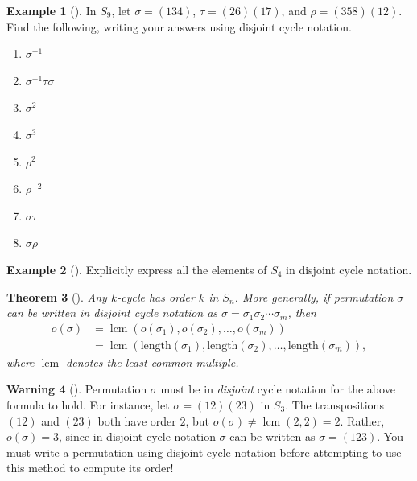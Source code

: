 \documentclass[10pt,openany,oneside]{book}
\theoremstyle{plain}
\newtheorem{theorem}{Theorem}[section]
\theoremstyle{definition}
\theoremstyle{definition}
\newtheorem{warning}[theorem]{Warning}
\theoremstyle{definition}
\newtheorem{example}[theorem]{Example}
\theoremstyle{definition}
\numberwithin{equation}{section}
\DeclareMathOperator{\lcm}{lcm}
\newcommand{\amp}{&}
\begin{document}
\begin{example}[]\label{s9ex}
In \(S_9\), let \(\sigma=(134)\), \(\tau=(26)(17)\), and \(\rho=(358)(12)\). Find the following, writing your answers using disjoint cycle notation. \leavevmode%
\begin{multicols}{4}
\begin{enumerate}[label=\alph*]
\item\hypertarget{li-331}{}\(\sigma^{-1}\)%
\item\hypertarget{li-332}{}\(\sigma^{-1}\tau\sigma\)%
\item\hypertarget{li-333}{}\(\sigma^2\)%
\item\hypertarget{li-334}{}\(\sigma^3\)%
\item\hypertarget{li-335}{}\(\rho^2\)%
\item\hypertarget{li-336}{}\(\rho^{-2}\)%
\item\hypertarget{li-337}{}\(\sigma \tau\)%
\item\hypertarget{li-338}{}\(\sigma \rho\)%
\end{enumerate}
\end{multicols}
%
\end{example}
\begin{example}[]\label{example-55}
Explicitly express all the elements of \(S_4\) in disjoint cycle notation.%
\end{example}
\begin{theorem}[{}]\label{kcyc}
Any \(k\)-cycle has order \(k\) in \(S_n\). More generally, if permutation \(\sigma\) can be written in disjoint cycle notation as \(\sigma=\sigma_1 \sigma_2 \cdots \sigma_m\), then%
\begin{align*}
o(\sigma)\amp =\lcm(o(\sigma_1), o(\sigma_2),\ldots, o(\sigma_m))\\
\amp =\lcm(\mathrm{length}(\sigma_1),\mathrm{length}(\sigma_2),\ldots,\mathrm{length}(\sigma_m)),
\end{align*}
where \(\lcm\) denotes the least common multiple.%
\end{theorem}
\begin{warning}[]\label{warning-18}
Permutation \(\sigma\) must be in \emph{disjoint} cycle notation for the above formula to hold. For instance, let \(\sigma=(12)(23)\) in \(S_3\). The transpositions \((12)\) and \((23)\) both have order \(2\), but \(o(\sigma)\neq \lcm(2,2)=2\). Rather, \(o(\sigma)=3\), since in disjoint cycle notation \(\sigma\) can be written as \(\sigma=(123)\). You must write a permutation using disjoint cycle notation before attempting to use this method to compute its order!%
\end{warning}
\end{document}
